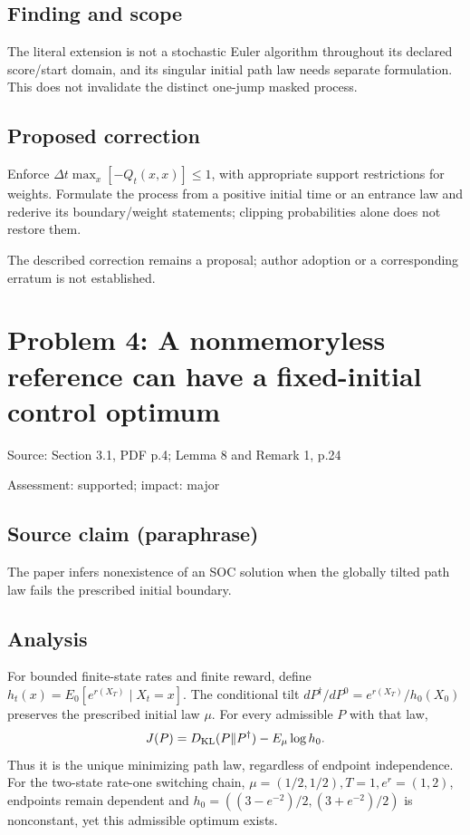 \documentclass[11pt]{article}
\begin{document}
\subsection*{Finding and scope}

The literal extension is not a stochastic Euler algorithm throughout its declared score/start domain, and its singular initial path law needs separate formulation. This does not invalidate the distinct one-jump masked process.

\subsection*{Proposed correction}

Enforce \(\Delta t\max_x[-Q_t(x,x)]\leq1\), with appropriate support restrictions for weights. Formulate the process from a positive initial time or an entrance law and rederive its boundary/weight statements; clipping probabilities alone does not restore them.

The described correction remains a proposal; author adoption or a corresponding erratum is not established.

\section*{Problem 4: A nonmemoryless reference can have a fixed-initial control optimum}

Source: Section 3.1, PDF p.4; Lemma 8 and Remark 1, p.24

Assessment: supported; impact: major

\subsection*{Source claim (paraphrase)}

The paper infers nonexistence of an SOC solution when the globally tilted path law fails the prescribed initial boundary.

\subsection*{Analysis}

For bounded finite-state rates and finite reward, define \(h_t(x)=E_0[e^{r(X_T)}\mid X_t=x]\). The conditional tilt \(dP^\dagger/dP^0=e^{r(X_T)}/h_0(X_0)\) preserves the prescribed initial law \(\mu\). For every admissible \(P\) with that law, \[J(P)=D_{\rm KL}(P\Vert P^\dagger)-E_\mu\log h_0.\] Thus it is the unique minimizing path law, regardless of endpoint independence. For the two-state rate-one switching chain, \(\mu=(1/2,1/2),T=1,e^r=(1,2)\), endpoints remain dependent and \(h_0=((3-e^{-2})/2,(3+e^{-2})/2)\) is nonconstant, yet this admissible optimum exists.
\end{document}
